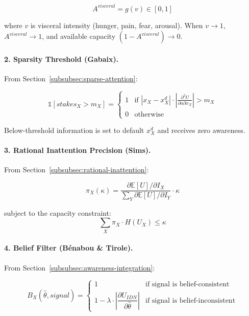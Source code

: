 \begin{equation}
A^{visceral} = g(v) \in [0, 1]
\end{equation}

where $v$ is visceral intensity (hunger, pain, fear, arousal). When $v \to 1$, 
$A^{visceral} \to 1$, and available capacity $(1 - A^{visceral}) \to 0$.

\paragraph{2. Sparsity Threshold (Gabaix).}
From Section~\ref{subsubsec:sparse-attention}:

\begin{equation}
\mathbb{1}[stakes_X > m_X] = 
\begin{cases}
1 & \text{if } |x_X - x^d_X| \cdot \left|\frac{\partial^2 U}{\partial a \partial x_X}\right| > m_X \\
0 & \text{otherwise}
\end{cases}
\end{equation}

Below-threshold information is set to default $x^d_X$ and receives zero awareness.

\paragraph{3. Rational Inattention Precision (Sims).}
From Section~\ref{subsubsec:rational-inattention}:

\begin{equation}
\pi_X(\kappa) = \frac{\partial \mathbb{E}[U] / \partial I_X}{\sum_Y \partial \mathbb{E}[U] / \partial I_Y} \cdot \kappa
\end{equation}

subject to the capacity constraint:
\begin{equation}
\sum_X \pi_X \cdot H(U_X) \leq \kappa
\end{equation}

\paragraph{4. Belief Filter (Bénabou \& Tirole).}
From Section~\ref{subsubsec:awareness-integration}:

\begin{equation}
B_X(\hat{\theta}, signal) = 
\begin{cases}
1 & \text{if signal is belief-consistent} \\[6pt]
1 - \lambda \cdot \left| \dfrac{\partial U_{IDN}}{\partial \hat{\theta}} \right| & \text{if signal is belief-inconsistent}
\end{cases}
\end{equation}

